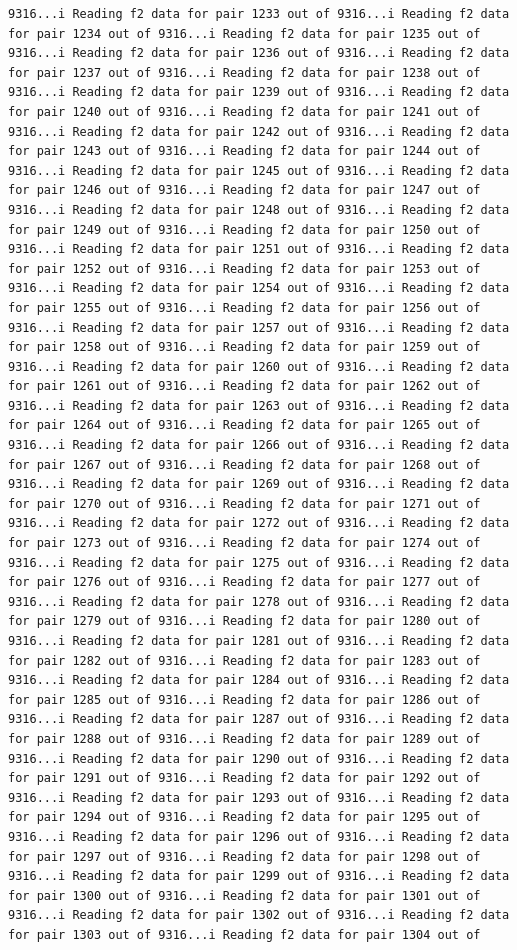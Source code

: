 \documentclass[
]{article}
\begin{document}
\begin{verbatim}
9316...i Reading f2 data for pair 1233 out of 9316...i Reading f2 data for pair 1234 out of 9316...i Reading f2 data for pair 1235 out of 9316...i Reading f2 data for pair 1236 out of 9316...i Reading f2 data for pair 1237 out of 9316...i Reading f2 data for pair 1238 out of 9316...i Reading f2 data for pair 1239 out of 9316...i Reading f2 data for pair 1240 out of 9316...i Reading f2 data for pair 1241 out of 9316...i Reading f2 data for pair 1242 out of 9316...i Reading f2 data for pair 1243 out of 9316...i Reading f2 data for pair 1244 out of 9316...i Reading f2 data for pair 1245 out of 9316...i Reading f2 data for pair 1246 out of 9316...i Reading f2 data for pair 1247 out of 9316...i Reading f2 data for pair 1248 out of 9316...i Reading f2 data for pair 1249 out of 9316...i Reading f2 data for pair 1250 out of 9316...i Reading f2 data for pair 1251 out of 9316...i Reading f2 data for pair 1252 out of 9316...i Reading f2 data for pair 1253 out of 9316...i Reading f2 data for pair 1254 out of 9316...i Reading f2 data for pair 1255 out of 9316...i Reading f2 data for pair 1256 out of 9316...i Reading f2 data for pair 1257 out of 9316...i Reading f2 data for pair 1258 out of 9316...i Reading f2 data for pair 1259 out of 9316...i Reading f2 data for pair 1260 out of 9316...i Reading f2 data for pair 1261 out of 9316...i Reading f2 data for pair 1262 out of 9316...i Reading f2 data for pair 1263 out of 9316...i Reading f2 data for pair 1264 out of 9316...i Reading f2 data for pair 1265 out of 9316...i Reading f2 data for pair 1266 out of 9316...i Reading f2 data for pair 1267 out of 9316...i Reading f2 data for pair 1268 out of 9316...i Reading f2 data for pair 1269 out of 9316...i Reading f2 data for pair 1270 out of 9316...i Reading f2 data for pair 1271 out of 9316...i Reading f2 data for pair 1272 out of 9316...i Reading f2 data for pair 1273 out of 9316...i Reading f2 data for pair 1274 out of 9316...i Reading f2 data for pair 1275 out of 9316...i Reading f2 data for pair 1276 out of 9316...i Reading f2 data for pair 1277 out of 9316...i Reading f2 data for pair 1278 out of 9316...i Reading f2 data for pair 1279 out of 9316...i Reading f2 data for pair 1280 out of 9316...i Reading f2 data for pair 1281 out of 9316...i Reading f2 data for pair 1282 out of 9316...i Reading f2 data for pair 1283 out of 9316...i Reading f2 data for pair 1284 out of 9316...i Reading f2 data for pair 1285 out of 9316...i Reading f2 data for pair 1286 out of 9316...i Reading f2 data for pair 1287 out of 9316...i Reading f2 data for pair 1288 out of 9316...i Reading f2 data for pair 1289 out of 9316...i Reading f2 data for pair 1290 out of 9316...i Reading f2 data for pair 1291 out of 9316...i Reading f2 data for pair 1292 out of 9316...i Reading f2 data for pair 1293 out of 9316...i Reading f2 data for pair 1294 out of 9316...i Reading f2 data for pair 1295 out of 9316...i Reading f2 data for pair 1296 out of 9316...i Reading f2 data for pair 1297 out of 9316...i Reading f2 data for pair 1298 out of 9316...i Reading f2 data for pair 1299 out of 9316...i Reading f2 data for pair 1300 out of 9316...i Reading f2 data for pair 1301 out of 9316...i Reading f2 data for pair 1302 out of 9316...i Reading f2 data for pair 1303 out of 9316...i Reading f2 data for pair 1304 out of 
\end{verbatim}
\end{document}
